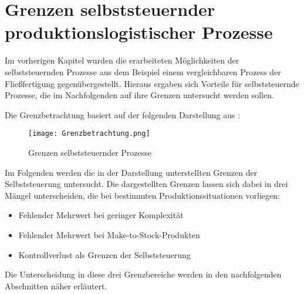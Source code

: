 \section{Grenzen selbststeuernder produktionslogistischer Prozesse}
\label{sec:Grenzen}

Im vorherigen Kapitel wurden die erarbeiteten Möglichkeiten der
selbststeuernden Prozesse aus dem Beispiel einem vergleichbaren Prozess der
Fließfertigung gegenübergestellt. Hieraus ergaben sich Vorteile für
selbststeuernde Prozesse, die im Nachfolgenden auf ihre Grenzen untersucht
werden sollen.

Die Grenzbetrachtung basiert auf der folgenden Darstellung aus
\citet{evolution2007}:

\begin{figure}[htb] 
\centering
\texttt{[image: Grenzbetrachtung.png]}
\caption[Grenzbetrachtung]{Grenzen selbststeuernder Prozesse\protect\footnotemark}
\label{fig:Grenzbetrachtung}
\end{figure}

Im Folgenden werden die in der Darstellung unterstellten Grenzen der
Selbststeuerung untersucht. Die dargestellten Grenzen lassen sich dabei in drei
Mängel unterscheiden, die bei bestimmten Produktionssituationen vorliegen:

\begin{itemize}
  \item Fehlender Mehrwert bei geringer Komplexität
  \item Fehlender Mehrwert bei Make-to-Stock-Produkten
  \item Kontrollverlust als Grenzen der Selbststeuerung
\end{itemize}

Die Unterscheidung in diese drei Grenzbereiche werden in den nachfolgenden 
Abschnitten näher erläutert.



